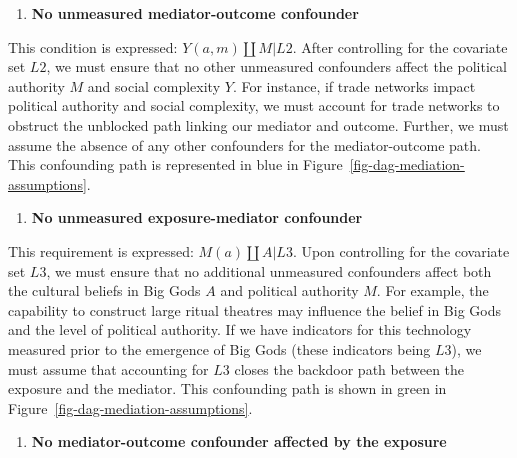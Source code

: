 \documentclass[
  singlecolumn,
  9pt]{article}
\providecommand{\tightlist}{%
  \setlength{\itemsep}{0pt}\setlength{\parskip}{0pt}}\usepackage{longtable,booktabs,array}
\begin{document}
\begin{enumerate}
\def\labelenumi{\arabic{enumi}.}
\setcounter{enumi}{1}
\tightlist
\item
  \textbf{No unmeasured mediator-outcome confounder}
\end{enumerate}

This condition is expressed: \(Y(a,m) \coprod M | L2\). After
controlling for the covariate set \(L2\), we must ensure that no other
unmeasured confounders affect the political authority \(M\) and social
complexity \(Y\). For instance, if trade networks impact political
authority and social complexity, we must account for trade networks to
obstruct the unblocked path linking our mediator and outcome. Further,
we must assume the absence of any other confounders for the
mediator-outcome path. This confounding path is represented in blue in
Figure~\ref{fig-dag-mediation-assumptions}.

\begin{enumerate}
\def\labelenumi{\arabic{enumi}.}
\setcounter{enumi}{2}
\tightlist
\item
  \textbf{No unmeasured exposure-mediator confounder}
\end{enumerate}

This requirement is expressed: \(M(a) \coprod A | L3\). Upon controlling
for the covariate set \(L3\), we must ensure that no additional
unmeasured confounders affect both the cultural beliefs in Big Gods
\(A\) and political authority \(M\). For example, the capability to
construct large ritual theatres may influence the belief in Big Gods and
the level of political authority. If we have indicators for this
technology measured prior to the emergence of Big Gods (these indicators
being \(L3\)), we must assume that accounting for \(L3\) closes the
backdoor path between the exposure and the mediator. This confounding
path is shown in green in Figure~\ref{fig-dag-mediation-assumptions}.

\begin{enumerate}
\def\labelenumi{\arabic{enumi}.}
\setcounter{enumi}{3}
\tightlist
\item
  \textbf{No mediator-outcome confounder affected by the exposure}
\end{enumerate}
\end{document}
